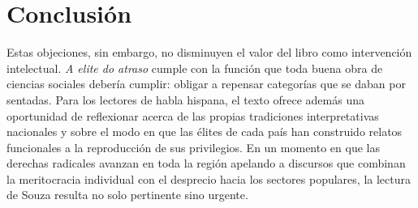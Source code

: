 \section{Conclusión}
Estas objeciones, sin embargo, no disminuyen el valor del libro como intervención intelectual. \textit{A elite do atraso} cumple con la función que toda buena obra de ciencias sociales debería cumplir: obligar a repensar categorías que se daban por sentadas. Para los lectores de habla hispana, el texto ofrece además una oportunidad de reflexionar acerca de las propias tradiciones interpretativas nacionales y sobre el modo en que las élites de cada país han construido relatos funcionales a la reproducción de sus privilegios. En un momento en que las derechas radicales avanzan en toda la región apelando a discursos que combinan la meritocracia individual con el desprecio hacia los sectores populares, la lectura de Souza resulta no solo pertinente sino urgente.


